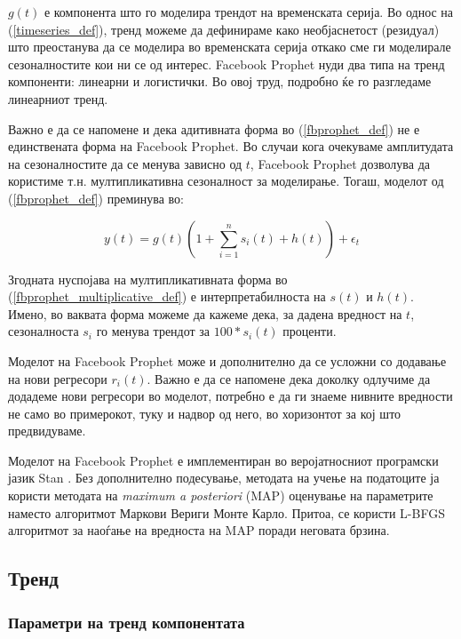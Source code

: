 \documentclass[12pt]{article}
\numberwithin{equation}{section}
\begin{document}
\(g(t)\) е компонента што го моделира трендот на временската серија. Во однос на (\ref{timeseries_def}), тренд можеме да дефинираме како необјаснетост (резидуал) што преостанува да се моделира во временската серија откако сме ги моделирале сезоналностите кои ни се од интерес. Facebook Prophet нуди два типа на тренд компоненти: линеарни и логистички. Во овој труд, подробно ќе го разгледаме линеарниот тренд.

Важно е да се напомене и дека адитивната форма во (\ref{fbprophet_def}) не е единствената форма на Facebook Prophet. Во случаи кога очекуваме амплитудата на сезоналностите да се менува зависно од \(t\), Facebook Prophet дозволува да користиме т.н. мултипликативна сезоналност за моделирање. Тогаш, моделот од (\ref{fbprophet_def}) преминува во:

\begin{equation}\label{fbprophet_multiplicative_def}
    y(t) = g(t)(1 + \sum_{i=1}^{n}s_i(t) + h(t)) + \epsilon_t
\end{equation}

Згодната нуспојава на мултипликативната форма во (\ref{fbprophet_multiplicative_def}) е интерпретабилноста на \(s(t)\) и \(h(t)\). Имено, во ваквата форма можеме да кажеме дека, за дадена вредност на \(t\), сезоналноста \(s_i\) го менува трендот за \(100 * s_i(t)\) проценти.

Моделот на Facebook Prophet може и дополнително да се усложни со додавање на нови регресори \(r_i(t)\). Важно е да се напомене дека доколку одлучиме да додадеме нови регресори во моделот, потребно е да ги знаеме нивните вредности не само во примерокот, туку и надвор од него, во хоризонтот за кој што предвидуваме.

Моделот на Facebook Prophet е имплементиран во веројатносниот програмски јазик Stan \cite{carpenter2017stan}. Без дополнително подесување, методата на учење на податоците ја користи методата на \textit{maximum a posteriori} (MAP) оценување на параметрите наместо алгоритмот Маркови Вериги Монте Карло. Притоа, се користи L-BFGS алгоритмот \cite{liu1989limited} за наоѓање на вредноста на MAP поради неговата брзина.

\subsection{Тренд}

\subsubsection{Параметри на тренд компонентата}
\end{document}

